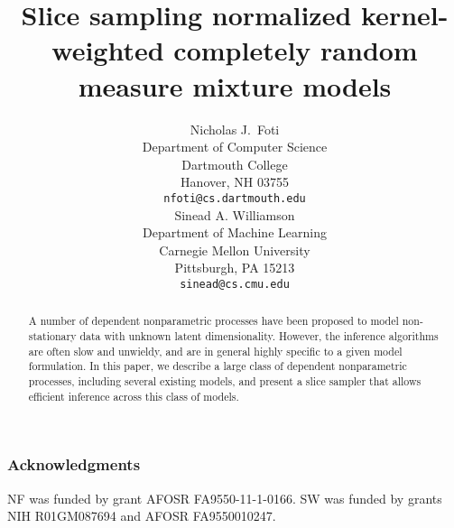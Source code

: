\documentclass{article} %
\title{Slice sampling normalized kernel-weighted completely random measure
mixture models}
\author{
Nicholas J.~Foti \\
Department of Computer Science\\
Dartmouth College\\
Hanover, NH 03755 \\
\texttt{nfoti@cs.dartmouth.edu} \\
\And
Sinead A. Williamson \\
Department of Machine Learning \\
Carnegie Mellon University \\
Pittsburgh, PA 15213 \\
\texttt{sinead@cs.cmu.edu} \\
}
\begin{document}
\maketitle

\begin{abstract}
  A number of dependent nonparametric processes have been
  proposed to model non-stationary data with unknown latent dimensionality.
  However, the inference algorithms are often slow and unwieldy, and are in
  general highly specific to a given model formulation. In this paper, we
  describe a large class of dependent nonparametric processes, including several existing
  models, and present a slice sampler that allows efficient inference across
  this class of models.
\end{abstract}


%





\subsubsection*{Acknowledgments}
NF was funded by grant AFOSR FA9550-11-1-0166.  
SW was funded by grants NIH R01GM087694 and AFOSR FA9550010247.  

\newpage



\end{document}
